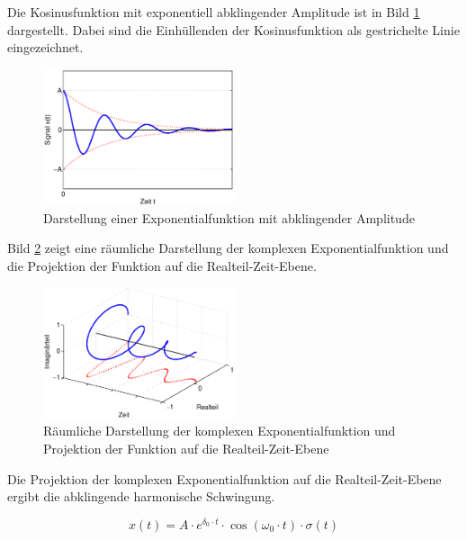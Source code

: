 \noindent Die Kosinusfunktion mit exponentiell abklingender Amplitude ist in Bild \ref{fig:KomplexExponentialfunktion} dargestellt. Dabei sind die Einh\"{u}llenden der Kosinusfunktion als gestrichelte Linie eingezeichnet.

\clearpage
\begin{figure}[H]
  \centerline{\includegraphics[width=0.5\textwidth]{Kapitel1/Bilder/image25}}
  \caption{Darstellung einer Exponentialfunktion mit abklingender Amplitude}
  \label{fig:KomplexExponentialfunktion}
\end{figure}

\noindent Bild \ref{fig:KomplexExponentialfunktion3D} zeigt eine r\"{a}umliche Darstellung der komplexen Exponentialfunktion und die Projektion der Funktion auf die Realteil-Zeit-Ebene.

\begin{figure}[H]
  \centerline{\includegraphics[width=0.5\textwidth]{Kapitel1/Bilder/image26}}
  \caption{R\"{a}umliche Darstellung der komplexen Exponentialfunktion und Projektion der Funktion auf die Realteil-Zeit-Ebene}
  \label{fig:KomplexExponentialfunktion3D}
\end{figure}

\noindent Die Projektion der komplexen Exponentialfunktion auf die Realteil-Zeit-Ebene ergibt die abklingende harmonische Schwingung.

\begin{equation}\label{eq:oneninetyseven}
x\left(t\right)=A\cdot e^{\delta _{0} \cdot t} \cdot \cos \left(\omega _{0} \cdot t\right)\cdot \sigma \left(t\right)
\end{equation}

